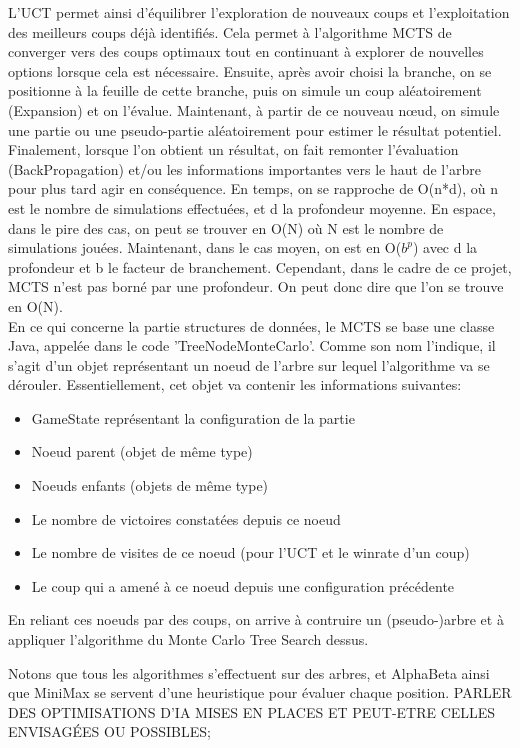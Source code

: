 \documentclass{article}
\begin{document}
\begin{itemize}
    L’UCT permet ainsi d’équilibrer l’exploration de nouveaux coups et l’exploitation des meilleurs coups déjà identifiés.
    Cela permet à l’algorithme MCTS de converger vers des coups optimaux tout en continuant à explorer de nouvelles options lorsque cela est nécessaire.
    Ensuite, après avoir choisi la branche, on se positionne à la feuille de cette branche,
    puis on simule un coup aléatoirement (Expansion) et on l'évalue. Maintenant, à partir de ce nouveau nœud, on simule une partie ou une pseudo-partie
    aléatoirement pour estimer le résultat potentiel. Finalement, lorsque l'on obtient un résultat, on fait remonter l'évaluation (BackPropagation)
    et/ou les informations importantes vers le haut de l'arbre pour plus tard agir en conséquence. En temps, on se rapproche de O(n*d), où n est le
    nombre de simulations effectuées, et d la profondeur moyenne. En espace, dans le pire des cas, on peut se trouver en O(N) où N est le nombre
    de simulations jouées. Maintenant, dans le cas moyen, on est en O($b^p$) avec d la profondeur et b le facteur de branchement.
    Cependant, dans le cadre de ce projet, MCTS n'est pas borné par une profondeur. On peut donc dire que l'on se trouve en O(N).\\
    En ce qui concerne la partie structures de données, le MCTS se base une classe Java, appelée dans le code 'TreeNodeMonteCarlo'.
    Comme son nom l'indique, il s'agit d'un objet représentant un noeud de l'arbre sur lequel l'algorithme va se dérouler.
    Essentiellement, cet objet va contenir les informations suivantes:
    \begin{itemize}
        \item GameState représentant la configuration de la partie
        \item Noeud parent (objet de même type)
        \item Noeuds enfants (objets de même type)
        \item Le nombre de victoires constatées depuis ce noeud
        \item Le nombre de visites de ce noeud (pour l'UCT et le winrate d'un coup)
        \item Le coup qui a amené à ce noeud depuis une configuration précédente
    \end{itemize}
    En reliant ces noeuds par des coups, on arrive à contruire un (pseudo-)arbre et à appliquer l'algorithme du Monte Carlo Tree Search dessus.
\end{itemize}

\par Notons que tous les algorithmes s'effectuent sur des arbres, et AlphaBeta ainsi que MiniMax se servent d'une heuristique pour évaluer chaque position.
PARLER DES OPTIMISATIONS D'IA MISES EN PLACES ET PEUT-ETRE CELLES ENVISAGÉES OU POSSIBLES;
\end{document}
